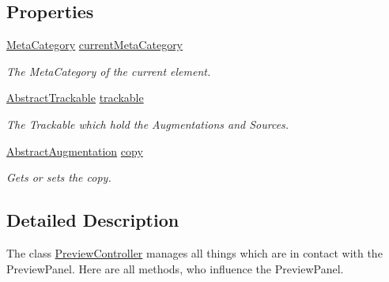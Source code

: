 \subsection*{Properties}
\begin{DoxyCompactItemize}
\item 
\hypertarget{class_preview_controller_adf3c4a7bbd75ba87a843a3b56b0a04e2}{\hyperlink{namespace_a_rdev_kit_1_1_controller_1_1_editor_controller_a304367964b3f3f5c115bb81e7b31d534}{Meta\-Category} \hyperlink{class_preview_controller_adf3c4a7bbd75ba87a843a3b56b0a04e2}{current\-Meta\-Category}}\label{class_preview_controller_adf3c4a7bbd75ba87a843a3b56b0a04e2}

\begin{DoxyCompactList}\small\item\em The Meta\-Category of the current element. \end{DoxyCompactList}\item 
\hypertarget{class_preview_controller_a38df415628d33de07a741fd3d80f5647}{\hyperlink{class_a_rdev_kit_1_1_model_1_1_project_1_1_abstract_trackable}{Abstract\-Trackable} \hyperlink{class_preview_controller_a38df415628d33de07a741fd3d80f5647}{trackable}}\label{class_preview_controller_a38df415628d33de07a741fd3d80f5647}

\begin{DoxyCompactList}\small\item\em The Trackable which hold the Augmentations and Sources. \end{DoxyCompactList}\item 
\hyperlink{class_a_rdev_kit_1_1_model_1_1_project_1_1_abstract_augmentation}{Abstract\-Augmentation} \hyperlink{class_preview_controller_a3f44a88dd89aa311b734034de2f70417}{copy}
\begin{DoxyCompactList}\small\item\em Gets or sets the copy. \end{DoxyCompactList}\end{DoxyCompactItemize}


\subsection{Detailed Description}
The class \hyperlink{class_preview_controller}{Preview\-Controller} manages all things which are in contact with the Preview\-Panel. Here are all methods, who influence the Preview\-Panel. 



